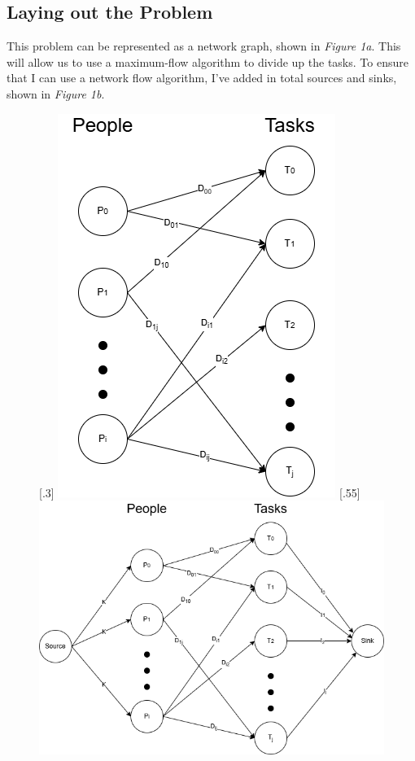 \documentclass{article}
\newcommand\tab[1][1cm]{\hspace*{#1}}
\begin{document}
\subsection*{Laying out the Problem}
\tab This problem can be represented as a network graph, shown in \textit{Figure 1a}. This will allow us to use a maximum-flow algorithm to divide up the tasks. To ensure that I can use a network flow algorithm, I've added in
total sources and sinks, shown in \textit{Figure 1b}.
\begin{figure}[ht!]
  [.3\linewidth]{
    \includegraphics[width=\linewidth]{fig1.png}
  }
  \hfill
  [.55\linewidth]{
    \includegraphics[width=\linewidth]{fig1b.png}
  }


\end{figure}
\end{document}
